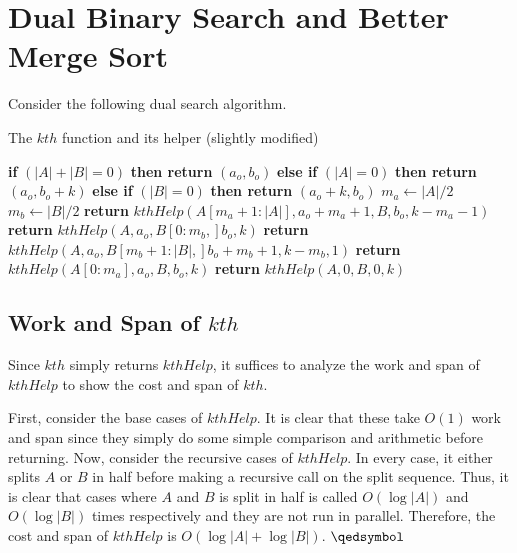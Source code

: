 \chapter{Dual Binary Search and Better Merge Sort}

Consider the following dual search algorithm.

\begin{algorithm}
\caption{The $kth$ function and its helper (slightly modified)}
\begin{algorithmic}[1]

	\State \textbf{if} $(|A| + |B| = 0)$ \textbf{then return} $(a_o, b_o)$
	\State \textbf{else if} $(|A| = 0)$ \textbf{then return} $(a_o, b_o + k)$
	\State \textbf{else if} $(|B| = 0)$ \textbf{then return} $(a_o + k, b_o)$
	\State 
	\State $m_a \gets |A| / 2$
	\State $m_b \gets |B| / 2$
			\State \textbf{return} $kthHelp(A[m_a + 1:|A|], a_o + m_a + 1, B, b_o, k - m_a - 1)$
		\EndCase
			\State \textbf{return} $kthHelp(A, a_o, B[0:m_b,] b_o, k)$
		\EndCase
			\State \textbf{return} $kthHelp(A, a_o, B[m_b + 1:|B|,] b_o + m_b + 1, k-m_b, 1)$
		\EndCase
			\State \textbf{return} $kthHelp(A[0:m_a], a_o, B, b_o, k)$
		\EndCase
	\EndSwitch
\EndProcedure
\State
{}
	\State \textbf{return} $kthHelp(A, 0, B, 0, k)$
\EndProcedure

\end{algorithmic}
\end{algorithm}

\section{Work and Span of $kth$}

Since $kth$ simply returns $kthHelp$, it suffices to analyze the work and span of $kthHelp$ to show the cost and span of $kth$.

First, consider the base cases of $kthHelp$. It is clear that these take $O(1)$ work and span since they simply do some simple comparison and arithmetic before returning. Now, consider the recursive cases of $kthHelp$. In every case, it either splits $A$ or $B$ in half before making a recursive call on the split sequence. Thus, it is clear that cases where $A$ and $B$ is split in half is called $O(\log |A|)$ and $O(\log |B|)$ times respectively and they are not run in parallel. Therefore, the cost and span of $kthHelp$ is $O(\log |A| + \log |B|)$. $\qedsymbol$
